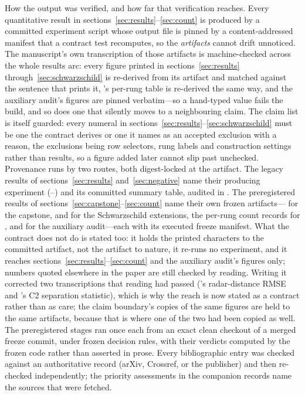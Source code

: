 How the output was verified, and how far that verification reaches.
Every quantitative result in
sections~\ref{sec:results}--\ref{sec:count} is produced by a committed
experiment script whose output file is pinned by a content-addressed
manifest that a contract test recomputes, so the \emph{artifacts} cannot
drift unnoticed. The manuscript's own transcription of those artifacts is
machine-checked across the whole results arc: every figure printed in
sections~\ref{sec:results} through~\ref{sec:schwarzschild} is re-derived
from its artifact and matched against the sentence that prints it,
's per-rung table is re-derived the same way, and the
auxiliary audit's figures are pinned verbatim---so a hand-typed value
fails the build, and so does one that silently moves to a neighbouring
claim. The claim list is itself guarded: every numeral in
sections~\ref{sec:results}--\ref{sec:schwarzschild} must be one the
contract derives or one it names as an accepted exclusion with a reason,
the exclusions being row selectors, rung labels and construction settings
rather than results, so a figure added later cannot slip past unchecked.
Provenance runs by two routes, both digest-locked at the artifact. The
legacy results of sections~\ref{sec:results} and~\ref{sec:negative} name
their producing experiment (--) and its
committed summary table, audited in . The
preregistered results of sections~\ref{sec:capstone}--\ref{sec:count}
name their own frozen artifacts---
for the capstone,  and
 for the Schwarzschild extensions, the
per-rung count records for , and
 for the auxiliary audit---each with its
executed freeze manifest. What the contract does not do is stated too: it
holds the printed characters to the committed artifact, not the artifact
to nature, it re-runs no experiment, and it reaches
sections~\ref{sec:results}--\ref{sec:count} and the auxiliary audit's
figures only; numbers quoted elsewhere in the paper are still checked by
reading. Writing it corrected two transcriptions that reading had passed
('s radar-distance RMSE and 's C2
separation statistic), which is why the reach is now stated as a contract
rather than as care; the claim boundary's copies of the same figures are
held to the same artifacts, because that is where one of the two had been
copied as well. The preregistered stages ran once each from an exact
clean checkout of a merged freeze commit, under frozen decision rules,
with their verdicts computed by the frozen code rather than asserted in
prose. Every bibliographic entry was checked against an authoritative
record (arXiv, Crossref, or the publisher) and then re-checked
independently; the priority assessments in the companion records name the
sources that were fetched.

